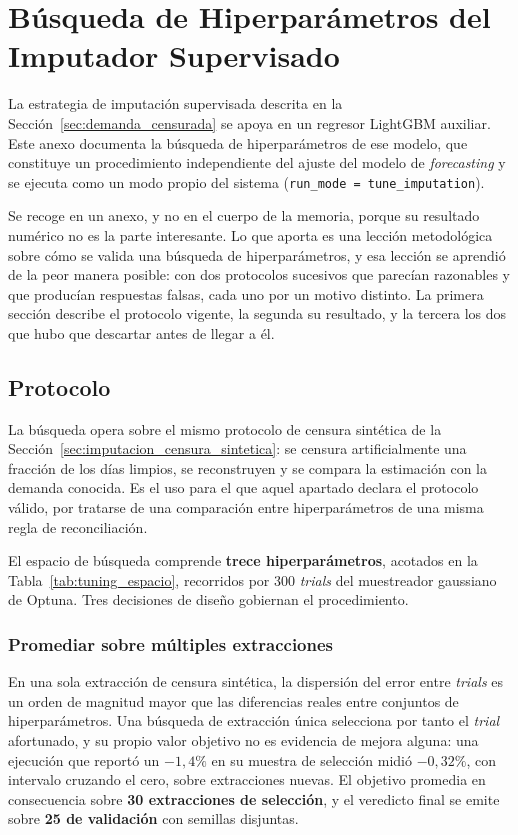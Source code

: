 \chapter[Búsqueda de hiperparámetros del imputador]{Búsqueda de Hiperparámetros del Imputador Supervisado}
\label{anx:tuning_imputador}

La estrategia de imputación supervisada descrita en la Sección~\ref{sec:demanda_censurada} se
apoya en un regresor LightGBM auxiliar. Este anexo documenta la búsqueda de hiperparámetros de
ese modelo, que constituye un procedimiento independiente del ajuste del modelo de
\textit{forecasting} y se ejecuta como un modo propio del sistema
(\texttt{run\_mode = tune\_imputation}).

Se recoge en un anexo, y no en el cuerpo de la memoria, porque su resultado numérico no es la
parte interesante. Lo que aporta es una lección metodológica sobre cómo se valida una búsqueda
de hiperparámetros, y esa lección se aprendió de la peor manera posible: con dos protocolos
sucesivos que parecían razonables y que producían respuestas falsas, cada uno por un motivo
distinto. La primera sección describe el protocolo vigente, la segunda su resultado, y la
tercera los dos que hubo que descartar antes de llegar a él.

\section{Protocolo}
\label{sec:tuning_protocolo}

La búsqueda opera sobre el mismo protocolo de censura sintética de la
Sección~\ref{sec:imputacion_censura_sintetica}: se censura artificialmente una fracción de los
días limpios, se reconstruyen y se compara la estimación con la demanda conocida. Es el uso
para el que aquel apartado declara el protocolo válido, por tratarse de una comparación entre
hiperparámetros de una misma regla de reconciliación.

El espacio de búsqueda comprende \textbf{trece hiperparámetros}, acotados en la
Tabla~\ref{tab:tuning_espacio}, recorridos por 300 \textit{trials} del muestreador gaussiano de
Optuna. Tres decisiones de diseño gobiernan el procedimiento.

\subsection*{Promediar sobre múltiples extracciones}

En una sola extracción de censura sintética, la dispersión del error entre \textit{trials} es un
orden de magnitud mayor que las diferencias reales entre conjuntos de hiperparámetros. Una
búsqueda de extracción única selecciona por tanto el \textit{trial} afortunado, y su propio valor
objetivo no es evidencia de mejora alguna: una ejecución que reportó un $-1{,}4\%$ en su muestra
de selección midió $-0{,}32\%$, con intervalo cruzando el cero, sobre extracciones nuevas. El
objetivo promedia en consecuencia sobre \textbf{30 extracciones de selección}, y el veredicto
final se emite sobre \textbf{25 de validación} con semillas disjuntas.

